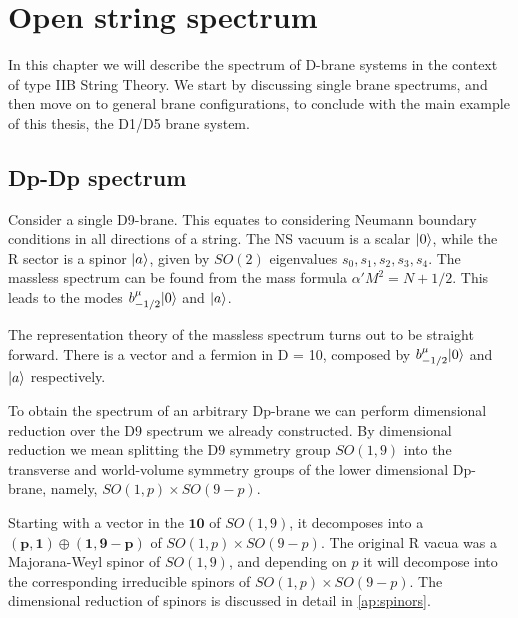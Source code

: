 

\chapter{Open string spectrum}
\label{chap:spectrum}
\pagestyle{fancy}

In this chapter we will describe the spectrum of D-brane systems in the context of type IIB String Theory. We start by discussing single brane spectrums, and then move on to general brane configurations, to conclude with the main example of this thesis, the D1/D5 brane system.

\section{Dp-Dp spectrum}


Consider a single D9-brane. This equates to considering Neumann boundary conditions in all directions of a string. The NS vacuum is a scalar $\lvert0\rangle$, while the R sector is a spinor $\lvert a\rangle$, given by $SO(2)$ eigenvalues $s_0, s_1, s_2, s_3, s_4$. The massless spectrum can be found from the mass formula $\alpha ' M^2 = N + 1/2$. This leads to the modes $b_{-1/2}^\mu \lvert0\rangle$ and $\lvert a\rangle$.

The representation theory of the massless spectrum turns out to be straight forward. There is a vector and a fermion in D = 10, composed by $b_{-1/2}^\mu \lvert0\rangle$ and $\lvert a\rangle$ respectively.

To obtain the spectrum of an arbitrary Dp-brane we can perform dimensional reduction over the D9 spectrum we already constructed. By dimensional reduction we mean splitting the D9 symmetry group $SO(1,9)$ into the transverse and world-volume symmetry groups of the lower dimensional Dp-brane, namely, $SO(1,p) \times SO(9-p)$. 

Starting with a vector in the $\mathbf{10}$ of $SO(1,9)$, it decomposes into a $(\mathbf{p},\mathbf{1}) \oplus (\mathbf{1}, \mathbf{9-p})$ of $SO(1,p)\times SO(9-p)$. The original R vacua was a Majorana-Weyl spinor of $SO(1,9)$, and depending on $p$ it will decompose into the corresponding irreducible spinors of $SO(1,p)\times SO(9-p)$. The dimensional reduction of spinors is discussed in detail in \ref{ap:spinors}.


